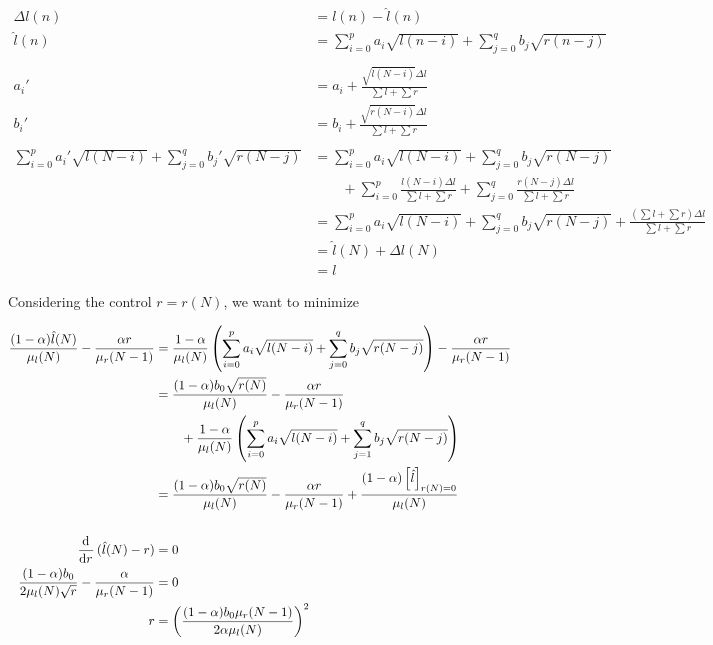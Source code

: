 \documentclass[12pt]{article}
\begin{document}
\begin{align*}
    \Delta{l}(n) &= l(n) - \hat{l}(n)\\
    \hat{l}(n) &= \sum_{i = 0}^p a_i \sqrt{l(n - i)} + \sum_{j = 0}^q b_j \sqrt{r(n - j)}\\
    \\
    a_i' &= a_i + \frac{\sqrt{l(N - i)} \Delta{l}}{\sum l + \sum r}\\
    b_i' &= b_i + \frac{\sqrt{r(N - i)} \Delta{l}}{\sum l + \sum r}\\
    \\
    \sum_{i = 0}^p a_i' \sqrt{l(N - i)} + \sum_{j = 0}^q b_j' \sqrt{r(N - j)} &=
    \sum_{i = 0}^p a_i \sqrt{l(N - i)} + \sum_{j = 0}^q b_j \sqrt{r(N - j)}\\
    &\qquad + \sum_{i = 0}^p \frac{l(N - i) \Delta{l}}{\sum l + \sum r}
    + \sum_{j = 0}^q \frac{r(N - j) \Delta{l}}{\sum l + \sum r}\\
    &= \sum_{i = 0}^p a_i \sqrt{l(N - i)} + \sum_{j = 0}^q b_j \sqrt{r(N - j)}
    + \frac{(\sum l + \sum r) \Delta{l}}{\sum l + \sum r}\\
    &= \hat{l}(N) + \Delta{l}(N)\\
    &= l
\end{align*}

Considering the control $r = r(N)$, we want to minimize

\begin{align*}
    \frac{(1 - \alpha) \hat{l}(N)}{\mu_l(N)} - \frac{\alpha r}{\mu_r(N - 1)} &=
    \frac{1 - \alpha}{\mu_l(N)} \del{\sum_{i = 0}^p a_i \sqrt{l(N - i)} + \sum_{j = 0}^q b_j \sqrt{r(N - j)}}
    - \frac{\alpha r}{\mu_r(N - 1)}\\
    &= \frac{(1 - \alpha) b_0 \sqrt{r(N)}}{\mu_l(N)} - \frac{\alpha r}{\mu_r(N - 1)}\\
    &\qquad + \frac{1 - \alpha}{\mu_l(N)} \del{\sum_{i = 0}^p a_i \sqrt{l(N - i)} + \sum_{j = 1}^q b_j \sqrt{r(N - j)}}\\
    &= \frac{(1 - \alpha) b_0 \sqrt{r(N)}}{\mu_l(N)} - \frac{\alpha r}{\mu_r(N - 1)} +
    \frac{(1 - \alpha) \sbr{\hat{l}}_{r(N) = 0}}{\mu_l(N)}\\
    \\
    \dod{}{r} (\hat{l}(N) - r) &= 0\\
    \frac{(1 - \alpha) b_0}{2 \mu_l(N) \sqrt{r}} - \frac{\alpha}{\mu_r(N - 1)} &= 0\\
    r &= \del{\frac{(1 - \alpha) b_0 \mu_r(N - 1)}{2 \alpha \mu_l(N)}}^2
\end{align*}
\end{document}

